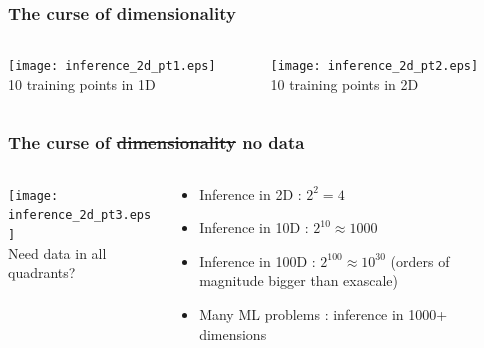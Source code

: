 \documentclass[aspectratio=169]{beamer}
\begin{document}
\begin{frame}
\frametitle{The curse of dimensionality}

\begin{columns}
\begin{column}{0.5\textwidth}
\begin{center}
\texttt{[image: inference\_2d\_pt1.eps]}\\
10 training points in 1D
\end{center}
\end{column}

\begin{column}{0.5\textwidth}
\begin{center}
\texttt{[image: inference\_2d\_pt2.eps]}\\
10 training points in 2D
\end{center}
\end{column}
\end{columns}
\end{frame}

\begin{frame}
\frametitle{The curse of \sout{dimensionality} no data}

\begin{columns}
\begin{column}{0.5\textwidth}
\begin{center}
\texttt{[image: inference\_2d\_pt3.eps]}\\
Need data in all quadrants?
\end{center}
\end{column}

\begin{column}{0.5\textwidth}
\pause
\begin{itemize}
\item Inference in 2D : $2^2 = 4$
\item Inference in 10D : $2^{10} \approx 1000$
\item Inference in 100D : $2^{100} \approx 10^{30}$ (orders of magnitude bigger than exascale)
\item Many ML problems : inference in 1000+ dimensions
\end{itemize}
\end{column}
\end{columns}

\end{frame}
\end{document}
